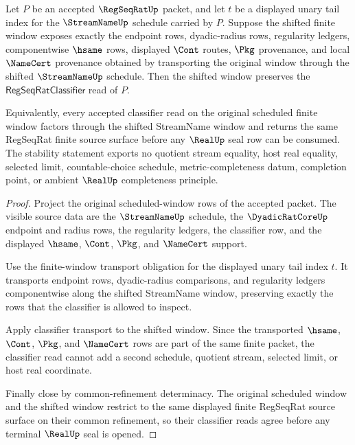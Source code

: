 \begin{theorem}
\label{thm:regseqrat-tail-shift-stability}
Let $P$ be an accepted $\RegSeqRatUp$ packet, and let $t$ be a displayed unary tail index for the $\StreamNameUp$ schedule carried by $P$. Suppose the shifted finite window exposes exactly the endpoint rows, dyadic-radius rows, regularity ledgers, componentwise $\hsame$ rows, displayed $\Cont$ routes, $\Pkg$ provenance, and local $\NameCert$ provenance obtained by transporting the original window through the shifted $\StreamNameUp$ schedule. Then the shifted window preserves the $\mathsf{RegSeqRatClassifier}$ read of $P$.

Equivalently, every accepted classifier read on the original scheduled finite window factors through the shifted StreamName window and returns the same RegSeqRat finite source surface before any $\RealUp$ seal row can be consumed. The stability statement exports no quotient stream equality, host real equality, selected limit, countable-choice schedule, metric-completeness datum, completion point, or ambient $\RealUp$ completeness principle.
\end{theorem}
\begin{proof}
Project the original scheduled-window rows of the accepted packet. The visible source data are the $\StreamNameUp$ schedule, the $\DyadicRatCoreUp$ endpoint and radius rows, the regularity ledgers, the classifier row, and the displayed $\hsame$, $\Cont$, $\Pkg$, and $\NameCert$ support.

Use the finite-window transport obligation for the displayed unary tail index $t$. It transports endpoint rows, dyadic-radius comparisons, and regularity ledgers componentwise along the shifted StreamName window, preserving exactly the rows that the classifier is allowed to inspect.

Apply classifier transport to the shifted window. Since the transported $\hsame$, $\Cont$, $\Pkg$, and $\NameCert$ rows are part of the same finite packet, the classifier read cannot add a second schedule, quotient stream, selected limit, or host real coordinate.

Finally close by common-refinement determinacy. The original scheduled window and the shifted window restrict to the same displayed finite RegSeqRat source surface on their common refinement, so their classifier reads agree before any terminal $\RealUp$ seal is opened.
\end{proof}

